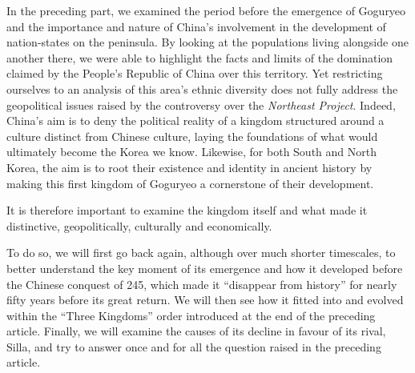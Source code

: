 \documentclass[11pt,a4paper]{article}
\begin{document}
\thispagestyle{empty}
\par\medskip
{}
\smallskip{}
\medskip
\noindent{\color{accent}\rule{\linewidth}{0.8pt}}\par\smallskip
{}\par\bigskip

In the preceding part, we examined the period before the emergence of Goguryeo and the importance and nature of China's involvement in the development of nation-states on the peninsula. By looking at the populations living alongside one another there, we were able to highlight the facts and limits of the domination claimed by the People's Republic of China over this territory. Yet restricting ourselves to an analysis of this area's ethnic diversity does not fully address the geopolitical issues raised by the controversy over the \emph{Northeast Project}. Indeed, China's aim is to deny the political reality of a kingdom structured around a culture distinct from Chinese culture, laying the foundations of what would ultimately become the Korea we know. Likewise, for both South and North Korea, the aim is to root their existence and identity in ancient history by making this first kingdom of Goguryeo a cornerstone of their development.

It is therefore important to examine the kingdom itself and what made it distinctive, geopolitically, culturally and economically.

To do so, we will first go back again, although over much shorter timescales, to better understand the key moment of its emergence and how it developed before the Chinese conquest of 245, which made it ``disappear from history'' for nearly fifty years before its great return. We will then see how it fitted into and evolved within the ``Three Kingdoms'' order introduced at the end of the preceding article. Finally, we will examine the causes of its decline in favour of its rival, Silla, and try to answer once and for all the question raised in the preceding article.
\end{document}
